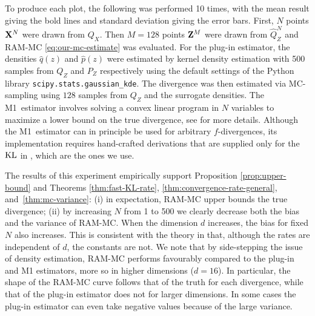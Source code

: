 To produce each plot, the following was performed 10 times, with the mean result giving the bold lines and standard deviation giving the error bars.
First, $N$ points $\mathbf{X}^N$ were drawn from $Q_X$. 
Then $M{=}128$ points $\mathbf{Z}^M$ were drawn from $\hat{Q}_Z^N$ and RAM-MC \eqref{eq:our-mc-estimate} was evaluated. 
For the plug-in estimator, the densities $\hat{q}(z)$ and $\hat{p}(z)$ were estimated by kernel density estimation with 500 samples from $Q_Z$ and $P_Z$ respectively using the default settings of the Python library {\texttt{scipy.stats.gaussian\_kde}}.
The divergence was then estimated via MC-sampling using $128$ samples from $Q_Z$ and the surrogate densities.
The M1~estimator involves solving a convex linear program in $N$ variables to maximize a lower bound on the true divergence, see \cite{nguyen10ratio} for more details.
Although the M1~estimator can in principle be used for arbitrary $f$-divergences, its implementation requires hand-crafted derivations that are supplied only for the $\mathrm{KL}$ in \cite{nguyen10ratio}, which are the ones we use.

The results of this experiment empirically support Proposition \ref{prop:upper-bound} and Theorems \ref{thm:fast-KL-rate}, \ref{thm:convergence-rate-general}, and~\ref{thm:mc-variance}:
(i) in expectation, RAM-MC upper bounds the true divergence; (ii) by increasing $N$ from 1 to 500 we clearly decrease both the bias and the variance of RAM-MC.
When the dimension $d$ increases, the bias for fixed $N$ also increases.
This is consistent with the theory in that, although the rates are independent of $d$, the constants are not.
We note that by side-stepping the issue of density estimation, RAM-MC performs favourably compared to the plug-in and M1 estimators, more so in higher dimensions ($d=16$).
In particular, the shape of the RAM-MC curve follows that of the truth for each divergence, while that of the plug-in estimator does not for larger dimensions.
In some cases the plug-in estimator can even take negative values because of the large variance.


